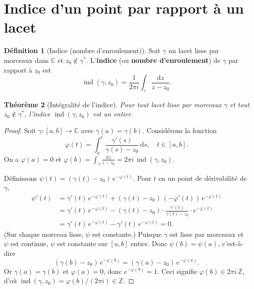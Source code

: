 \documentclass[12pt,a4paper,openany]{book}
\theoremstyle{definition}
\newtheorem{definition}{Définition}[chapter]
\theoremstyle{plain}
\newtheorem{theoreme}[definition]{Théorème}
\theoremstyle{remark}
\newcommand{\C}{\mathbb{C}}
\newcommand{\Z}{\mathbb{Z}}
\DeclareMathOperator{\ind}{ind}
\newcommand{\dd}{\mathrm{d}}
\begin{document}
\section{Indice d'un point par rapport à un lacet}\label{sec:indice}

\begin{definition}[Indice (nombre d'enroulement)]\label{def:indice}
Soit $\gamma$ un lacet lisse par morceaux dans $\C$ et $z_0 \notin \gamma^*$.
L'\textbf{indice} (ou \textbf{nombre
d'enroulement}) de $\gamma$ par rapport à $z_0$ est
\[
  \ind(\gamma, z_0) = \frac{1}{2\pi i} \int_\gamma \frac{\dd z}{z - z_0}.
\]
\end{definition}

\begin{theoreme}[Intégralité de l'indice]\label{thm:indice-entier}
Pour tout lacet lisse par morceaux $\gamma$ et tout $z_0 \notin \gamma^*$,
l'indice $\ind(\gamma, z_0)$ est un entier.
\end{theoreme}

\begin{proof}
Soit $\gamma \colon [a,b] \to \C$ avec $\gamma(a) = \gamma(b)$. Considérons
la fonction
\[
  \varphi(t) = \int_a^t \frac{\gamma'(s)}{\gamma(s) - z_0}\,\dd s,
  \quad t \in [a,b].
\]
On a $\varphi(a) = 0$ et $\varphi(b) = \int_\gamma \frac{\dd z}{z-z_0}
= 2\pi i \, \ind(\gamma, z_0)$.

Définissons $\psi(t) = (\gamma(t) - z_0)\,e^{-\varphi(t)}$.
Pour $t$ en un point de dérivabilité de $\gamma$,
\begin{align*}
  \psi'(t)
  &= \gamma'(t)\,e^{-\varphi(t)}
    + (\gamma(t)-z_0)\,(-\varphi'(t))\,e^{-\varphi(t)} \\
  &= \gamma'(t)\,e^{-\varphi(t)}
    - (\gamma(t)-z_0) \cdot \frac{\gamma'(t)}{\gamma(t)-z_0} \cdot e^{-\varphi(t)} \\
  &= \gamma'(t)\,e^{-\varphi(t)} - \gamma'(t)\,e^{-\varphi(t)} = 0.
\end{align*}
(Sur chaque morceau lisse, $\psi$ est constante.) Puisque $\gamma$ est lisse
par morceaux et $\psi$ est continue, $\psi$ est constante sur $[a,b]$ entier.
Donc $\psi(b) = \psi(a)$, c'est-à-dire
\[
  (\gamma(b)-z_0)\,e^{-\varphi(b)} = (\gamma(a)-z_0)\,e^{-\varphi(a)}.
\]
Or $\gamma(a) = \gamma(b)$ et $\varphi(a) = 0$, donc $e^{-\varphi(b)} = 1$.
Ceci signifie $\varphi(b) \in 2\pi i\,\Z$, d'où
$\ind(\gamma, z_0) = \varphi(b)/(2\pi i) \in \Z$.
\end{proof}
\end{document}
